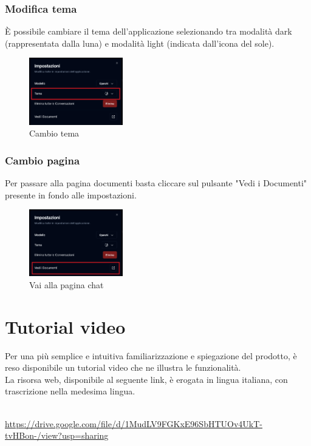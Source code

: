 \newpage
\subsubsection{Modifica tema}
È possibile cambiare il tema dell'applicazione selezionando tra modalità dark (rappresentata dalla luna) e modalità light (indicata dall'icona del sole).
\begin{figure}[h!]
    \centering
    \includegraphics[width=0.364\textwidth]{settingchattheme.png}
    \caption{Cambio tema}\label{fig:settingchattheme}
\end{figure}
\subsubsection{Cambio pagina}
Per passare alla pagina documenti basta cliccare sul pulsante "Vedi i Documenti" presente in fondo alle impostazioni.
\begin{figure}[h!]
    \centering
    \includegraphics[width=0.364\textwidth]{settingchatchange.png}
    \caption{Vai alla pagina chat}\label{fig:changepage}
\end{figure}

\newpage
\section{Tutorial video}\label{sec:video}

Per una più semplice e intuitiva familiarizzazione e spiegazione del prodotto, è reso disponibile un tutorial video che ne illustra le funzionalità.\\
La risorsa web, disponibile al seguente link, è erogata in lingua italiana, con trascrizione nella medesima lingua.\\ \\
\begin{footnotesize}
    \noindent \url{https://drive.google.com/file/d/1MudLV9FGKxE96SbHTUOv4UkT-tvHBon-/view?usp=sharing}
\end{footnotesize}
